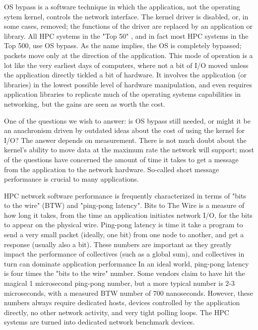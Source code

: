 \documentclass[letterpaper]{article}
\begin{document}
OS bypass is a software technique in which the application, not the operating sytem 
kernel, controls the network interface. The kernel driver is disabled, or, in some cases, removed; the functions of the driver are replaced by 
an application or library. 
All HPC systems in the "Top 50"%
, and in fact most HPC systems in the Top 500, use OS bypass.
As the name implies, the OS is completely bypassed; packets move only at the 
direction of the application. This mode of operation is a lot like the very earliest
days of computers, where not a bit of I/O moved unless the application
directly tickled a bit of hardware. It involves the application (or libraries) in the
lowest possible level of hardware manipulation, and even requires
application libraries to replicate much of the operating systems
capabilities in networking, but the gains are seen as worth the cost.

One of the questions we wish to answer: is OS bypass still needed, or might it be an anachronism driven
by outdated ideas about the cost of using the kernel for I/O?
The answer depends on measurement. There is not much doubt about the kernel's ability to move
data at the maximum rate the network will support; most of the questions have concerned the amount of 
time it takes to get a message from the application to the network hardware. 
So-called short message performance is crucial to many applications. 

HPC network software performance is frequently characterized in terms of "bits to the wire" (BTW) and "ping-pong latency". 
Bits to The Wire is a measure of how long it takes, 
from the time an application initiates
network I/O, for the bits to appear on the physical wire. Ping-pong latency 
is time it take a program to send a very small packet (ideally, one bit) from 
one node to another, and get a response (usually also a bit). 
These numbers are important as they greatly impact the performance of collectives (such as a global sum), 
and collectives in turn can dominate application performance\cite{petrini}\cite{ 10.1109/HPC.1997.592137}
In an ideal world, ping-pong latency is four times the "bits to the wire" number. 
Some vendors claim to have hit the magical 1 microsecond ping-pong number, but a more typical 
number is 2-3 microseconds, with a measured BTW number of 700 nanoseconds. 
However, these numbers always require dedicated hosts, devices
controlled by the application directly, no other network activity, 
and very tight polling loops. The HPC systems are turned into dedicated network benchmark devices. 
\end{document}
